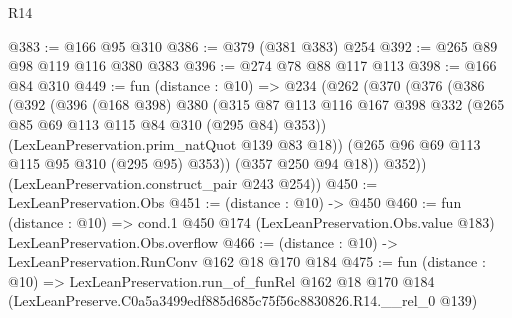 \begin{lexlean}{R14}
\begin{coremodule}
@383 := @166 @95 @310
@386 := @379 (@381 @383) @254
@392 := @265 @89 @98 @119 @116 @380 @383
@396 := @274 @78 @88 @117 @113
@398 := @166 @84 @310
@449 := fun (distance : @10) =>
  @234
    (@262
      (@370
        (@376
          (@386
            (@392
              (@396
                (@168 @398)
                @380
                (@315
                  @87
                  @113
                  @116
                  @167
                  @398
                  @332
                  (@265 @85 @69 @113 @115 @84 @310 (@295 @84) @353))
                (LexLeanPreservation.prim_natQuot @139 @83 @18))
              (@265 @96 @69 @113 @115 @95 @310 (@295 @95) @353))
            (@357 @250 @94 @18))
          @352))
      (LexLeanPreservation.construct_pair @243 @254))
@450 := LexLeanPreservation.Obs
@451 := (distance : @10) -> @450
@460 := fun (distance : @10) =>
  cond.{1} @450 @174 (LexLeanPreservation.Obs.value @183) LexLeanPreservation.Obs.overflow
@466 := (distance : @10) -> LexLeanPreservation.RunConv @162 @18 @170 @184
@475 := fun (distance : @10) =>
  LexLeanPreservation.run_of_funRel
    @162
    @18
    @170
    @184
    (LexLeanPreserve.C0a5a3499edf885d685c75f56c8830826.R14.__rel_0 @139)
\end{coremodule}
\end{lexlean}
